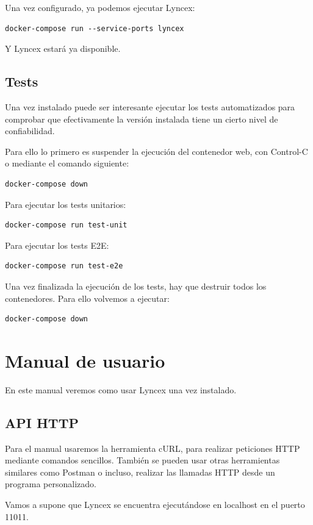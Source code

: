 \documentclass[12pt]{report} %
\begin{document}
Una vez configurado, ya podemos ejecutar Lyncex:
\begin{verbatim}
docker-compose run --service-ports lyncex
\end{verbatim}
Y Lyncex estará ya disponible.

\subsection{Tests}

Una vez instalado puede ser interesante ejecutar los tests automatizados para comprobar que efectivamente la versión instalada tiene un cierto nivel de confiabilidad.

Para ello lo primero es suspender la ejecución del contenedor web, con Control-C o mediante el comando siguiente:
\begin{verbatim}
docker-compose down
\end{verbatim}

Para ejecutar los tests unitarios:
\begin{verbatim}
docker-compose run test-unit
\end{verbatim}

Para ejecutar los tests E2E:
\begin{verbatim}
docker-compose run test-e2e
\end{verbatim}

Una vez finalizada la ejecución de los tests, hay que destruir todos los contenedores. Para ello volvemos a ejecutar:
\begin{verbatim}
docker-compose down
\end{verbatim}

\section{Manual de usuario}

En este manual veremos como usar Lyncex una vez instalado. 

\subsection{API HTTP}
Para el manual usaremos la herramienta cURL, para realizar peticiones HTTP mediante comandos sencillos. También se pueden usar otras herramientas similares como Postman o incluso, realizar las llamadas HTTP desde un programa personalizado.

Vamos a supone que Lyncex se encuentra ejecutándose en localhost en el puerto 11011.
\end{document}
